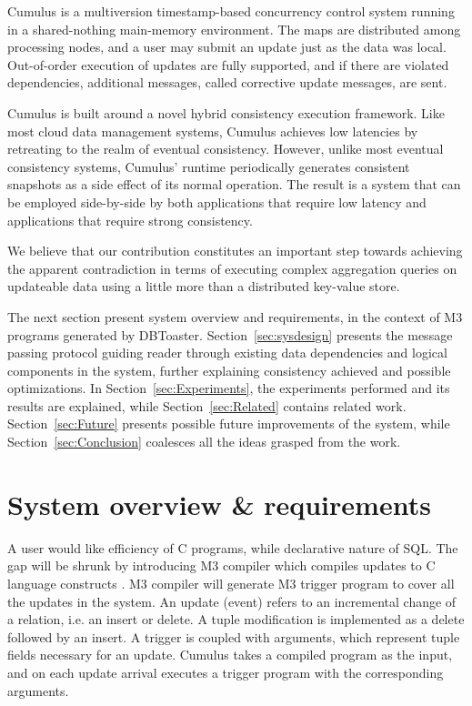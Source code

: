 \documentclass{sig-semester}
\def\SQL{SQL\xspace}
\def\M3{M3\xspace}
\begin{document}
Cumulus is a multiversion timestamp-based concurrency control system running in a shared-nothing main-memory environment. The maps are distributed among processing nodes, and a user may submit an update just as the data was local. Out-of-order execution of updates are fully supported, and if there are violated dependencies, additional messages, called corrective update messages, are sent.

Cumulus is built around a novel hybrid consistency execution framework. Like most cloud data management systems, Cumulus achieves low latencies by retreating to the realm of eventual consistency. However, unlike most eventual consistency systems, Cumulus' runtime periodically generates consistent snapshots as a side effect of its normal operation. The result is a system that can be employed side-by-side by both applications that require low latency and applications that require strong consistency.

We believe that our contribution constitutes an important step towards achieving the apparent contradiction in terms of executing complex aggregation queries on updateable data using a little more than a distributed key-value store.

The next section present system overview and requirements, in the context of \M3 programs generated by DBToaster. Section~\ref{sec:sysdesign} presents the message passing protocol guiding reader through existing data dependencies and logical components in the system, further explaining consistency achieved and possible optimizations. In Section~\ref{sec:Experiments}, the experiments performed and its results are explained, while Section~\ref{sec:Related} contains related work. Section~\ref{sec:Future} presents possible future improvements of the system, while Section~\ref{sec:Conclusion} coalesces all the ideas grasped from the work.

\section{System overview \& requirements}
\vspace{2mm}

A user would like efficiency of C programs, while declarative nature of \SQL. The gap will be shrunk by introducing \M3 compiler which compiles updates to C language constructs \cite{DBToasterCompiler09}. \M3 compiler will generate \M3 trigger program to cover all the updates in the system. An update (event) refers to an incremental change of a relation, i.e. an insert or delete. A tuple modification is implemented as a delete followed by an insert. A trigger is coupled with arguments, which represent tuple fields necessary for an update. Cumulus takes a compiled program as the input, and on each update arrival executes a trigger program with the corresponding arguments.
\end{document}
